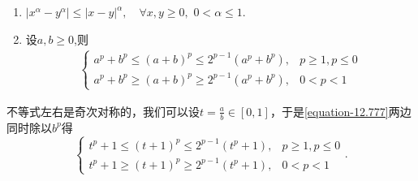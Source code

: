 \documentclass[../../main.tex]{subfiles}%
\begin{document}
\begin{proposition}[经典初等不等式]\label{proposition:经典初等不等式}
\begin{enumerate}[(1)]
\item\label{proposition:常用不等式222-1} $\left| x^{\alpha}-y^{\alpha} \right|\leqslant \left| x-y \right|^{\alpha},\quad \forall x,y\geqslant 0,\,\,0<\alpha \leqslant 1.$

\item 设\(a,b\geqslant0\),则
\begin{align}\label{equation-12.777}
\begin{cases}
a^p + b^p\leqslant(a + b)^p\leqslant2^{p - 1}(a^p + b^p),& p\geqslant1,p\leqslant0\\
a^p + b^p\geqslant(a + b)^p\geqslant2^{p - 1}(a^p + b^p),& 0 < p < 1
\end{cases}
\end{align}
\end{enumerate}
\end{proposition}
\begin{note}
不等式左右是奇次对称的，我们可以设\(t = \frac{a}{b}\in[0,1]\)，于是\eqref{equation-12.777}两边同时除以$b^p$得
\[
\begin{cases}
t^p + 1\leqslant(t + 1)^p\leqslant2^{p - 1}(t^p + 1),& p\geqslant1,p\leqslant0\\
t^p + 1\geqslant(t + 1)^p\geqslant2^{p - 1}(t^p + 1),& 0 < p < 1
\end{cases}.
\]
\end{note}
\end{document}
